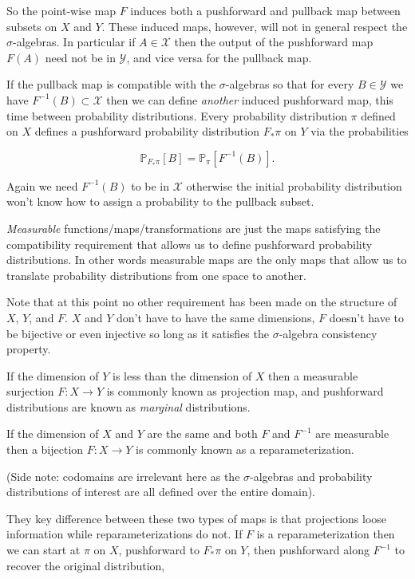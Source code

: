 \documentclass[
  letterpaper,
  DIV=11,
  numbers=noendperiod]{scrartcl}
\begin{document}
So the point-wise map \(F\) induces both a pushforward and pullback map
between subsets on \(X\) and \(Y\). These induced maps, however, will
not in general respect the \(\sigma\)-algebras. In particular if
\(A \in \mathcal{X}\) then the output of the pushforward map \(F(A)\)
need not be in \(\mathcal{Y}\), and vice versa for the pullback map.

If the pullback map is compatible with the \(\sigma\)-algebras so that
for every \(B \in \mathcal{Y}\) we have
\(F^{-1}(B) \subset \mathcal{X}\) then we can define \emph{another}
induced pushforward map, this time between probability distributions.
Every probability distribution \(\pi\) defined on \(X\) defines a
pushforward probability distribution \(F_{*} \pi\) on \(Y\) via the
probabilities

\[
\mathbb{P}_{F_{*} \pi}[B] = \mathbb{P}_{\pi}[ F^{-1}(B) ].
\]

Again we need \(F^{-1}(B)\) to be in \(\mathcal{X}\) otherwise the
initial probability distribution won't know how to assign a probability
to the pullback subset.

\emph{Measurable} functions/maps/transformations are just the maps
satisfying the compatibility requirement that allows us to define
pushforward probability distributions. In other words measurable maps
are the only maps that allow us to translate probability distributions
from one space to another.

Note that at this point no other requirement has been made on the
structure of \(X\), \(Y\), and \(F\). \(X\) and \(Y\) don't have to have
the same dimensions, \(F\) doesn't have to be bijective or even
injective so long as it satisfies the \(\sigma\)-algebra consistency
property.

If the dimension of \(Y\) is less than the dimension of \(X\) then a
measurable surjection \(F : X \rightarrow Y\) is commonly known as
projection map, and pushforward distributions are known as
\emph{marginal} distributions.

If the dimension of \(X\) and \(Y\) are the same and both \(F\) and
\(F^{-1}\) are measurable then a bijection \(F: X \rightarrow Y\) is
commonly known as a reparameterization.

(Side note: codomains are irrelevant here as the \(\sigma\)-algebras and
probability distributions of interest are all defined over the entire
domain).

They key difference between these two types of maps is that projections
loose information while reparameterizations do not. If \(F\) is a
reparameterization then we can start at \(\pi\) on \(X\), pushforward to
\(F_{*} \pi\) on \(Y\), then pushforward along \(F^{-1}\) to recover the
original distribution,
\end{document}
